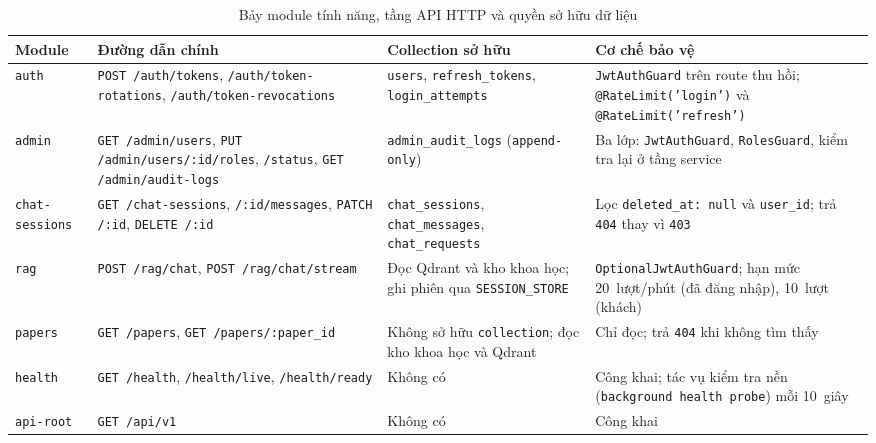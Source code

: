 \begin{table}[htbp]
\centering
\caption{Bảy module tính năng, tầng API HTTP và quyền sở hữu dữ liệu}
\label{tab:bay-module-tinh-nang}
\footnotesize
\setlength{\tabcolsep}{4pt}
\begin{tabularx}{\textwidth}{
  >{\raggedright\arraybackslash}p{2.3cm}
  >{\raggedright\arraybackslash}p{4.4cm}
  >{\raggedright\arraybackslash}p{4.0cm}
  >{\raggedright\arraybackslash}X
}
\toprule
\textbf{Module} & \textbf{Đường dẫn chính} & \textbf{Collection sở hữu} & \textbf{Cơ chế bảo vệ} \\
\midrule
\texttt{auth} & \texttt{POST /auth/tokens}, \texttt{/auth/\allowbreak{}token-\allowbreak{}rotations}, \texttt{/auth/\allowbreak{}token-\allowbreak{}revocations} & \texttt{users}, \texttt{refresh\_\allowbreak{}tokens}, \texttt{login\_\allowbreak{}attempts} & \texttt{JwtAuthGuard} trên route thu hồi; \texttt{@RateLimit('login')} và \texttt{@RateLimit('refresh')} \\
\midrule
\texttt{admin} & \texttt{GET /admin/users}, \texttt{PUT /admin/\allowbreak{}users/\allowbreak{}:id/\allowbreak{}roles}, \texttt{/status}, \texttt{GET /admin/\allowbreak{}audit-\allowbreak{}logs} & \texttt{admin\_\allowbreak{}audit\_\allowbreak{}logs} (\texttt{append-\allowbreak{}only}) & Ba lớp: \texttt{JwtAuthGuard}, \texttt{RolesGuard}, kiểm tra lại ở tầng service \\
\midrule
\texttt{chat-\allowbreak{}sessions} & \texttt{GET /chat-\allowbreak{}sessions}, \texttt{/:id/\allowbreak{}messages}, \texttt{PATCH /:id}, \texttt{DELETE /:id} & \texttt{chat\_\allowbreak{}sessions}, \texttt{chat\_\allowbreak{}messages}, \texttt{chat\_\allowbreak{}requests} & Lọc \texttt{deleted\_\allowbreak{}at:\allowbreak{} null} và \texttt{user\_\allowbreak{}id}; trả \texttt{404} thay vì \texttt{403} \\
\midrule
\texttt{rag} & \texttt{POST /rag/chat}, \texttt{POST /rag/chat/stream} & Đọc Qdrant và kho khoa học; ghi phiên qua \texttt{SESSION\_\allowbreak{}STORE} & \texttt{OptionalJwtAuthGuard}; hạn mức 20~lượt/phút (đã đăng nhập), 10~lượt (khách) \\
\midrule
\texttt{papers} & \texttt{GET /papers}, \texttt{GET /papers/\allowbreak{}:paper\_\allowbreak{}id} & Không sở hữu \texttt{collection}; đọc kho khoa học và Qdrant & Chỉ đọc; trả \texttt{404} khi không tìm thấy \\
\midrule
\texttt{health} & \texttt{GET /health}, \texttt{/health/live}, \texttt{/health/ready} & Không có & Công khai; tác vụ kiểm tra nền (\texttt{background health probe}) mỗi 10~giây \\
\midrule
\texttt{api-root} & \texttt{GET /api/v1} & Không có & Công khai \\
\bottomrule
\end{tabularx}
\end{table}

